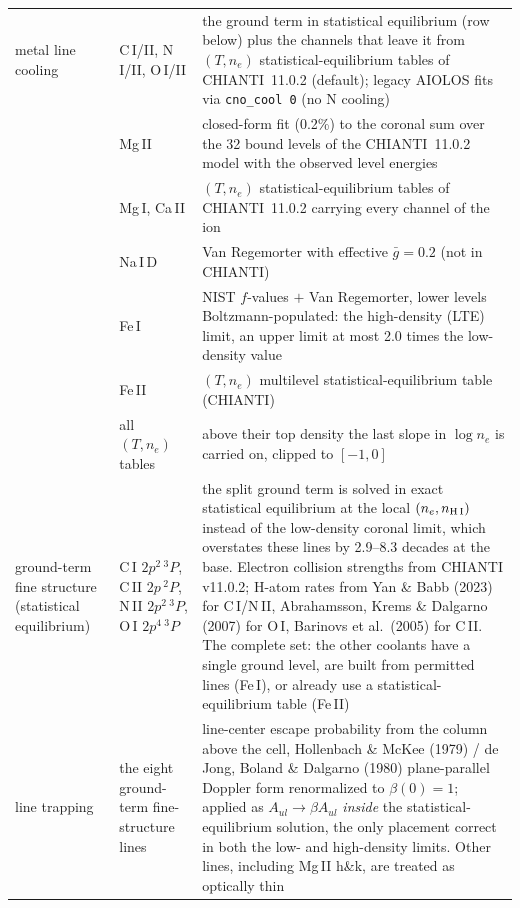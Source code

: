 \documentclass[english,a4paper]{my_memo}
\begin{document}
\begin{longtable}{@{}>{\raggedright\arraybackslash\hyphenpenalty=10000\exhyphenpenalty=10000}p{}p{}p{}@{}}
metal line cooling & C\,I/II, N\,I/II, O\,I/II & the ground term in statistical equilibrium (row below) plus the channels that leave it from $(T,n_e)$ statistical-equilibrium tables of CHIANTI~11.0.2 (default); legacy AIOLOS fits via \texttt{cno\_cool 0} (no N cooling) \\
 & Mg\,II & closed-form fit (0.2\%) to the coronal sum over the 32 bound levels of the CHIANTI~11.0.2 model with the observed level energies \\
 & Mg\,I, Ca\,II & $(T,n_e)$ statistical-equilibrium tables of CHIANTI~11.0.2 carrying every channel of the ion \\
 & Na\,I\,D & Van Regemorter with effective $\bar g=0.2$ (not in CHIANTI) \\
 & Fe\,I & NIST $f$-values $+$ Van Regemorter, lower levels Boltzmann-populated: the high-density (LTE) limit, an upper limit at most 2.0 times the low-density value \\
 & Fe\,II & $(T,n_e)$ multilevel statistical-equilibrium table (CHIANTI) \\
 & all $(T,n_e)$ tables & above their top density the last slope in $\log n_e$ is carried on, clipped to $[-1,0]$ \\
ground-term fine structure (statistical equilibrium) & C\,I $2p^2\,^3P$, C\,II $2p\,^2P$, N\,II $2p^2\,^3P$, O\,I $2p^4\,^3P$ & the split ground term is solved in exact statistical equilibrium at the local $(n_e, n_{\rm H\,I})$ instead of the low-density coronal limit, which overstates these lines by 2.9--8.3 decades at the base. Electron collision strengths from CHIANTI v11.0.2; H-atom rates from Yan \& Babb (2023) for C\,I/N\,II, Abrahamsson, Krems \& Dalgarno (2007) for O\,I, Barinovs et al.\ (2005) for C\,II. The complete set: the other coolants have a single ground level, are built from permitted lines (Fe\,I), or already use a statistical-equilibrium table (Fe\,II) \\
line trapping & the eight ground-term fine-structure lines & line-center escape probability from the column above the cell, Hollenbach \& McKee (1979) / de Jong, Boland \& Dalgarno (1980) plane-parallel Doppler form renormalized to $\beta(0)=1$; applied as $A_{ul}\!\to\!\beta A_{ul}$ \emph{inside} the statistical-equilibrium solution, the only placement correct in both the low- and high-density limits. Other lines, including Mg\,II h\&k, are treated as optically thin \\

\end{longtable}
\end{document}
